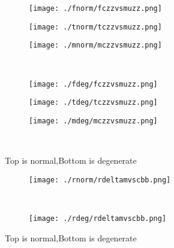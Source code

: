 \documentclass[aps,floats,floatfix,nofootinbib]{revtex4-1}
\begin{document}
\begin{center}
\begin{figure}
\begin{subfigure}{0.3\textwidth}
\texttt{[image: ./fnorm/fczzvsmuzz.png]}
\label{}
\end{subfigure}
\begin{subfigure}{0.3\textwidth}
\texttt{[image: ./tnorm/tczzvsmuzz.png]}
\label{}
\end{subfigure}
\begin{subfigure}{0.3\textwidth}
\texttt{[image: ./mnorm/mczzvsmuzz.png]}
\label{}
\end{subfigure}\\
\begin{subfigure}{0.3\textwidth}
\texttt{[image: ./fdeg/fczzvsmuzz.png]}
\label{}
\end{subfigure}
\begin{subfigure}{0.3\textwidth}
\texttt{[image: ./tdeg/tczzvsmuzz.png]}
\label{}
\end{subfigure}
\begin{subfigure}{0.3\textwidth}
\texttt{[image: ./mdeg/mczzvsmuzz.png]}
\label{}
\end{subfigure}\\
\caption{Top is normal,Bottom is degenerate}
\end{figure}
\end{center}

\begin{center}
\begin{figure}
\begin{subfigure}{1.0\textwidth}
\texttt{[image: ./rnorm/rdeltamvscbb.png]}
\label{}
\end{subfigure}\\
\begin{subfigure}{1.0\textwidth}
\texttt{[image: ./rdeg/rdeltamvscbb.png]}
\label{}
\end{subfigure}
\caption{Top is normal,Bottom is degenerate}
\end{figure}
\end{center}
\end{document}
